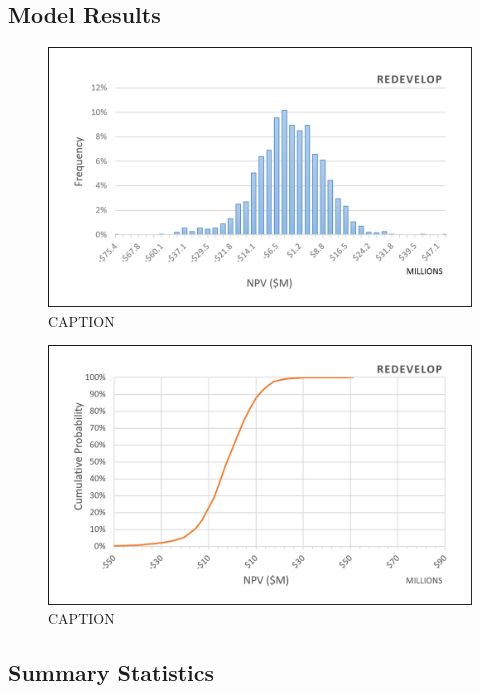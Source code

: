 \subsection{Model Results}
\label{ch6:redevelop_results}

\begin{figure}[!htp]
\centering
\includegraphics[width=.98\textwidth]{templates/images/Figure-Redevelop_Case_Histogram.png}
\caption[Probabilistic Redevelop Case histogram]{CAPTION}
\label{fig:redevelop_case_hist}
\end{figure}

\begin{figure}[!htp]
\centering
\includegraphics[width=.98\textwidth]{templates/images/Figure-Redevelop_Case_CDF.png}
\caption[Probabilistic Redevelop Case CDF]{CAPTION}
\label{fig:redevelop_case_cdf}
\end{figure}

\subsection{Summary Statistics}
\label{ch6:redevelop_stats}

